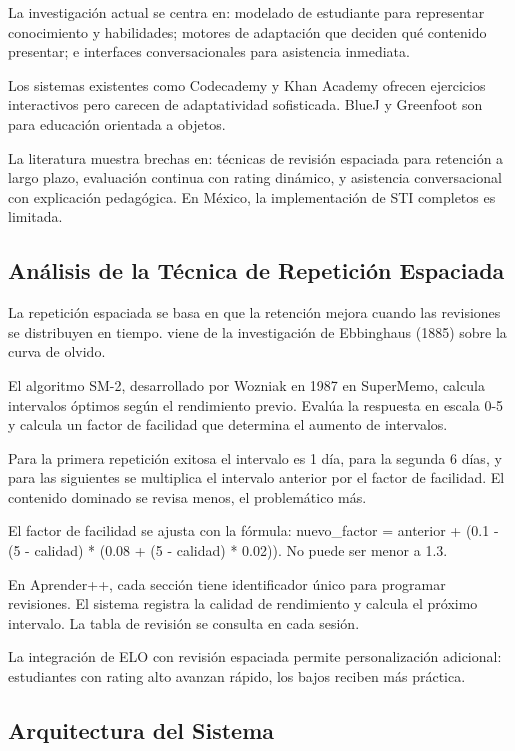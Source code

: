 \documentclass[12pt,letterpaper]{article}
\begin{document}
La investigación actual se centra en: modelado de estudiante para representar conocimiento y habilidades; motores de adaptación que deciden qué contenido presentar; e interfaces conversacionales para asistencia inmediata.

Los sistemas existentes como Codecademy y Khan Academy ofrecen ejercicios interactivos pero carecen de adaptatividad sofisticada. BlueJ y Greenfoot son para educación orientada a objetos.

La literatura muestra brechas en: técnicas de revisión espaciada para retención a largo plazo, evaluación continua con rating dinámico, y asistencia conversacional con explicación pedagógica. En México, la implementación de STI completos es limitada.

\subsection{Análisis de la Técnica de Repetición Espaciada}

La repetición espaciada se basa en que la retención mejora cuando las revisiones se distribuyen en tiempo. viene de la investigación de Ebbinghaus (1885) sobre la curva de olvido.

El algoritmo SM-2, desarrollado por Wozniak en 1987 en SuperMemo, calcula intervalos óptimos según el rendimiento previo. Evalúa la respuesta en escala 0-5 y calcula un factor de facilidad que determina el aumento de intervalos.

Para la primera repetición exitosa el intervalo es 1 día, para la segunda 6 días, y para las siguientes se multiplica el intervalo anterior por el factor de facilidad. El contenido dominado se revisa menos, el problemático más.

El factor de facilidad se ajusta con la fórmula: nuevo\_factor = anterior + (0.1 - (5 - calidad) * (0.08 + (5 - calidad) * 0.02)). No puede ser menor a 1.3.

En Aprender++, cada sección tiene identificador único para programar revisiones. El sistema registra la calidad de rendimiento y calcula el próximo intervalo. La tabla de revisión se consulta en cada sesión.

La integración de ELO con revisión espaciada permite personalización adicional: estudiantes con rating alto avanzan rápido, los bajos reciben más práctica.

\subsection{Arquitectura del Sistema}
\end{document}
